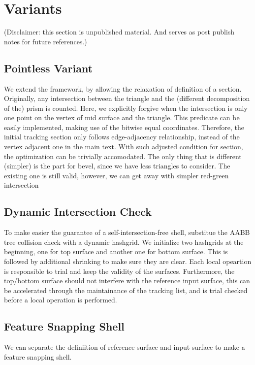 \section{Variants}
(Disclaimer: this section is unpublished material. And serves as post publish notes for future references.)
\subsection{Pointless Variant}
We extend the framework, by allowing the relaxation of definition of a section. 
Originally, any intersection between the triangle and the (different decomposition of the) prism is counted. Here, we explicitly forgive when the intersection is only one point on the vertex of mid surface and the triangle. 
This predicate can be easily implemented, making use of the bitwise equal coordinates.
Therefore, the initial tracking section only follows edge-adjacency relationship, instead of the vertex adjacent one in the main text. 
With such adjusted condition for section, the optimization can be trivially accomodated. The only thing that is different (simpler) is the part for bevel, since we have less triangles to consider.
The existing one is still valid, however, we can get away with simpler red-green intersection

\subsection{Dynamic Intersection Check}
To make easier the guarantee of a self-intersection-free shell, substitue the AABB tree collision check with a dynamic hashgrid. We initialize two hashgrids at the beginning, one for top surface and another one for bottom surface. This is followed by additional shrinking to make sure they are clear. Each local opeartion is responsible to trial and keep the validity of the surfaces. Furthermore, the top/bottom surface should not interfere with the reference input surface, this can be accelerated through the maintainance of the tracking list, and is trial checked before a local operation is performed.

\subsection{Feature Snapping Shell}
We can separate the definiition of reference surface and input surface to make a feature snapping shell.

